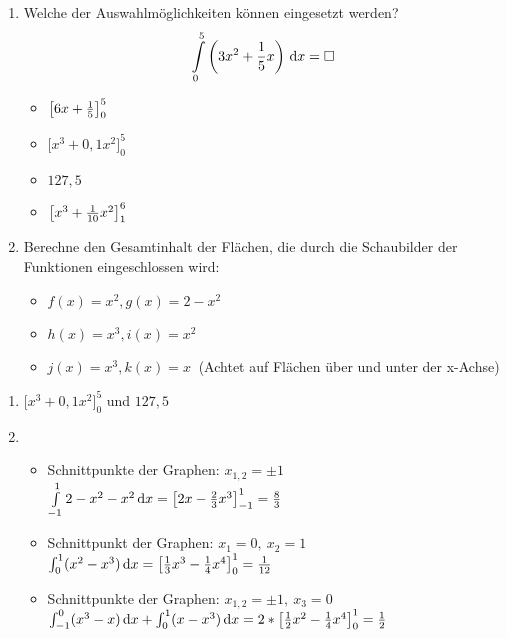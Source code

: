 \begin{enumerate}
	\item Welche der Auswahlmöglichkeiten können eingesetzt werden?
	\begin{equation*}
		\int\limits_0^5 \left(3x^2+ \frac 1 5 x\right)  \,\mathrm{d} x = \Box
	\end{equation*}
  \begin{multicols}{4}
    \begin{itemize}
      \item $\left[ 6x + \frac{1}{5} \right]_0^5$
      \item $\bigg[x^3 + 0,1 x^2\bigg]_0^5$
  		\item $127,5$
      \item $\left[ x^3 + \frac{1}{10} x^2 \right]_1^6$
  	\end{itemize}
  \end{multicols}
  \item Berechne den Gesamtinhalt der Flächen, die durch die Schaubilder der Funktionen eingeschlossen wird:
  \begin{itemize}
    \item $f(x)=x^2, g(x)=2-x^2$
    \item $h(x)=x^3, i(x)=x^2$
    \item $j(x)=x^3, k(x)=x\ $ (Achtet auf Flächen über und unter der x-Achse)
  \end{itemize}
\end{enumerate}
\begin{lsg}{}
  \begin{enumerate}
    \item $\bigg[x^3 + 0,1 x^2\bigg]_0^5$ und $127,5$
    \item
    \begin{itemize}
      \item Schnittpunkte der Graphen: $x_{1,2}=\pm 1$\\ $\int\limits_{-1}^1 2-x^2-x^2\,\mathrm{d} x=\left[2x-\frac{2}{3}x^3\right]_{-1}^1=\frac 8 3$
      \item Schnittpunkt der Graphen: $x_1=0,\ x_2=1$ \\$\int_0^1 (x^2-x^3)\,\mathrm{d} x=\left[\frac{1}{3}x^3-\frac{1}{4}x^4\right]_0^1=\frac 1 {12}$
      \item Schnittpunkte der Graphen: $x_{1,2}=\pm 1,\ x_3=0$ \\$\int_{-1}^0 (x^3-x)\,\mathrm{d} x+\int_0^1 (x-x^3)\,\mathrm{d} x=2*\left[\frac{1}{2}x^2-\frac{1}{4}x^4\right]_0^1=\frac 1 2$
    \end{itemize}
  \end{enumerate}
\end{lsg}


